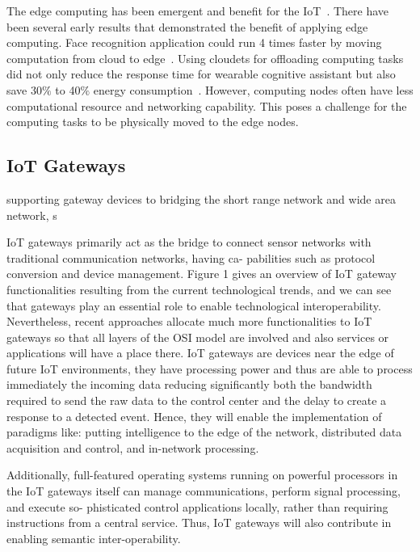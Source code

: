 The edge computing has been emergent and benefit for the IoT~\citep{Yu:2018}. 
There have been several early results that demonstrated the benefit of applying edge computing. 
Face recognition application could run 4 times faster by moving computation from cloud to edge~\citep{Yi:2015}.
Using cloudets for offloading computing tasks did not only reduce the response time for wearable cognitive assistant but also save 30$\%$ to 40$\%$ energy consumption~\citep{Ha:2014}. 
However, computing nodes often have less computational resource and networking capability. 
This poses a challenge for the computing tasks to be physically moved to the edge nodes.




\subsection{IoT Gateways}

supporting gateway devices to bridging the short range network and wide area network, s

IoT gateways primarily act as the bridge to connect sensor
networks with traditional communication networks, having ca-
pabilities such as protocol conversion and device management.
Figure 1 gives an overview of IoT gateway functionalities
resulting from the current technological trends, and we can
see that gateways play an essential role to enable technological
interoperability. Nevertheless, recent approaches allocate much
more functionalities to IoT gateways so that all layers of
the OSI model are involved and also services or applications
will have a place there. IoT gateways are devices near the
edge of future IoT environments, they have processing power
and thus are able to process immediately the incoming data
reducing significantly both the bandwidth required to send
the raw data to the control center and the delay to create
a response to a detected event. Hence, they will enable the
implementation of paradigms like: putting intelligence to the
edge of the network, distributed data acquisition and control,
and in-network processing.

Additionally, full-featured operating systems running on
powerful processors in the IoT gateways itself can manage
communications, perform signal processing, and execute so-
phisticated control applications locally, rather than requiring
instructions from a central service. Thus, IoT gateways will
also contribute in enabling semantic inter-operability.









